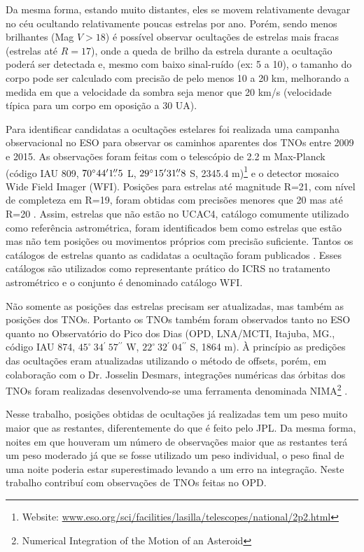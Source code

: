 \documentclass[12pt,a4paper]{monografia}
\newcommand{\degr}{\ensuremath{^{\circ}}}%
\newcommand{\arcmin}{\ensuremath{^{\prime}}}%
\newcommand{\arcsec}{\ensuremath{^{\prime\prime}}}%
\newcommand{\farcs}{\mbox{\ensuremath{.\!\!^{\prime\prime}}}}%
\begin{document}
Da mesma forma, estando muito distantes, eles se movem relativamente devagar no céu ocultando relativamente poucas estrelas por ano. Porém, sendo menos brilhantes (Mag $V > 18$) é possível observar ocultações de estrelas mais fracas (estrelas até $R = 17$), onde a queda de brilho da estrela durante a ocultação poderá ser detectada e, mesmo com baixo sinal-ruído (ex: 5 a 10), o tamanho do corpo pode ser calculado com precisão de pelo menos 10 a 20 km, melhorando a medida em que a velocidade da sombra seja menor que 20 km/s (velocidade típica para um corpo em oposição a 30 UA).

Para identificar candidatas a ocultações estelares foi realizada uma campanha observacional no ESO para observar os caminhos aparentes dos TNOs entre 2009 e 2015. As observações foram feitas com o telescópio de 2.2 m Max-Planck (código IAU 809, $70\degr44\arcmin1\farcs5$ L, $29\degr15\arcmin31\farcs8$ S, 2345.4 m)\footnote{Website: \url{www.eso.org/sci/facilities/lasilla/telescopes/national/2p2.html}} e o detector mosaico Wide Field Imager (WFI). Posições para estrelas até magnitude R=21, com nível de completeza em R=19, foram obtidas com precisões menores que 20 mas até R=20 \citep{Assafin2012}. Assim, estrelas que não estão no UCAC4, catálogo comumente utilizado como referência astrométrica, foram identificados bem como estrelas que estão mas não tem posições ou movimentos próprios com precisão suficiente. Tantos os catálogos de estrelas quanto as cadidatas a ocultação foram publicados \citep{Assafin2010, Assafin2012, Camargo2013}. Esses catálogos são utilizados como representante prático do ICRS no tratamento astrométrico e o conjunto é denominado catálogo WFI.

Não somente as posições das estrelas precisam ser atualizadas, mas também as posições dos TNOs. Portanto os TNOs também foram observados tanto no ESO quanto no Observatório do Pico dos Dias (OPD, LNA/MCTI, Itajuba, MG., código IAU 874, $45^{\circ} ~34\arcmin ~57\arcsec$ W, $22^{\circ} ~32\arcmin ~04\arcsec$ S, 1864 m). À princípio as predições das ocultações eram atualizadas utilizando o método de offsets, porém, em colaboração com o Dr. Josselin Desmars, integrações numéricas das órbitas dos TNOs foram realizadas desenvolvendo-se uma ferramenta denominada NIMA\footnote{Numerical Integration of the Motion of an Asteroid} \citep[submetido]{Desmars2015}.

Nesse trabalho, posições obtidas de ocultações já realizadas tem um peso muito maior que as restantes, diferentemente do que é feito pelo JPL. Da mesma forma, noites em que houveram um número de observações maior que as restantes terá um peso moderado já que se fosse utilizado um peso individual, o peso final de uma noite poderia estar superestimado levando a um erro na integração. Neste trabalho contribuí com observações de TNOs feitas no OPD.
\end{document}
